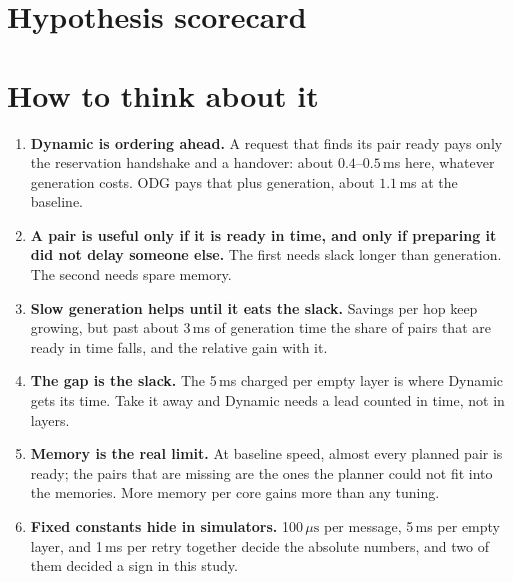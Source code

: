 \documentclass[11pt,a4paper]{report}
\newcommand{\code}[1]{\texttt{\detokenize{#1}}}
\newcommand{\ms}{\,ms}
\newcommand{\us}{\,\ensuremath{\mu\mathrm{s}}}
\begin{document}
\chapter{Hypothesis scorecard}
\begin{table}[htbp]\centering\scriptsize\caption{The ten hypotheses of \code{plan.md}, each judged by the rule written before the sweeps.}\label{tab:scorecard}\end{table}

\chapter{How to think about it}
\begin{enumerate}
\item \textbf{Dynamic is ordering ahead.} A request that finds its pair ready pays only the reservation handshake and a handover: about $0.4$--$0.5$\ms{} here, whatever generation costs. ODG pays that plus generation, about $1.1$\ms{} at the baseline.
\item \textbf{A pair is useful only if it is ready in time, and only if preparing it did not delay someone else.} The first needs slack longer than generation. The second needs spare memory.
\item \textbf{Slow generation helps until it eats the slack.} Savings per hop keep growing, but past about 3\ms{} of generation time the share of pairs that are ready in time falls, and the relative gain with it.
\item \textbf{The gap is the slack.} The 5\ms{} charged per empty layer is where Dynamic gets its time. Take it away and Dynamic needs a lead counted in time, not in layers.
\item \textbf{Memory is the real limit.} At baseline speed, almost every planned pair is ready; the pairs that are missing are the ones the planner could not fit into the memories. More memory per core gains more than any tuning.
\item \textbf{Fixed constants hide in simulators.} 100\us{} per message, 5\ms{} per empty layer, and 1\ms{} per retry together decide the absolute numbers, and two of them decided a sign in this study.
\end{enumerate}
\end{document}
